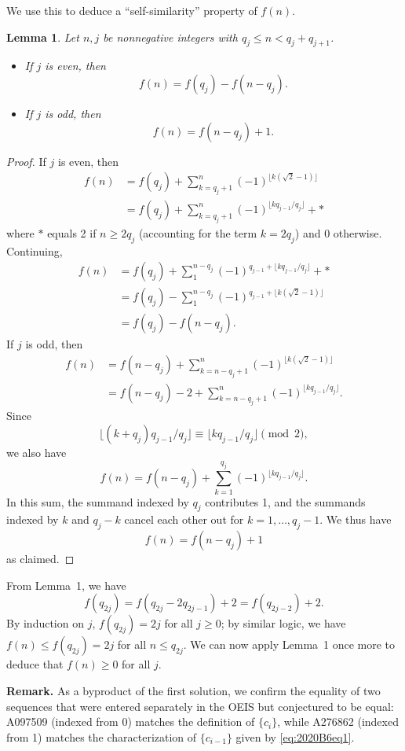\documentclass[amssymb,twocolumn,pra,10pt,aps]{revtex4-1}
\newtheorem{lemma}{Lemma}
\begin{document}
\begin{itemize}
We use this to deduce a ``self-similarity'' property of $f(n)$.
\setcounter{lemma}{0}
\begin{lemma}
Let $n,j$ be nonnegative integers with $q_j \leq n < q_j + q_{j+1}$.
\begin{itemize}
\item[(a)]
If $j$ is even, then
\[
f(n) = f(q_j) - f(n-q_j).
\]
\item[(b)]
If $j$ is odd, then
\[
f(n) = f(n-q_{j}) + 1.
\]
\end{itemize}
\end{lemma}
\begin{proof}
If $j$ is even, then
\begin{align*}
f(n) &= f(q_j) + \sum_{k=q_j+1}^n (-1)^{\lfloor k(\sqrt{2}-1) \rfloor} \\
&= f(q_j) + \sum_{k=q_j+1}^n (-1)^{\lfloor kq_{j-1}/q_j \rfloor} + *
\end{align*}
where $*$ equals 2 if $n \geq 2q_j$ (accounting for the term $k = 2q_j$) and 0 otherwise.
Continuing,
\begin{align*}
f(n)
&= f(q_j) + \sum_{1}^{n-q_j} (-1)^{q_{j-1} + \lfloor kq_{j-1}/q_j \rfloor} + * \\
&= f(q_j) - \sum_{1}^{n-q_j} (-1)^{q_{j-1} + \lfloor k(\sqrt{2}-1) \rfloor}\\
&= f(q_j) - f(n-q_j).
\end{align*}
If $j$ is odd, then
\begin{align*}
f(n) &= f(n-q_j) + \sum_{k=n-q_j+1}^n (-1)^{\lfloor k(\sqrt{2}-1) \rfloor} \\
&= f(n-q_j) -2 + \sum_{k=n-q_j+1}^n (-1)^{\lfloor kq_{j-1}/q_j \rfloor}.
\end{align*}
Since 
\[
\lfloor (k+q_j)q_{j-1}/q_j \rfloor \equiv \lfloor kq_{j-1}/q_j \rfloor \pmod{2},
\]
we also have
\[
f(n) = f(n-q_j) + \sum_{k=1}^{q_j} (-1)^{\lfloor kq_{j-1}/q_j \rfloor}.
\]
In this sum, the summand indexed by $q_j$ contributes 1, and the summands indexed by $k$ and $q_j-k$ cancel each other out for 
$k=1,\dots,q_j-1$. We thus have
\[
f(n) = f(n-q_j) + 1
\]
as claimed.
\end{proof}

From Lemma~1, we have
\[
f(q_{2j}) = f(q_{2j} - 2q_{2j-1}) + 2 = f(q_{2j-2}) + 2.
\]
By induction on $j$, $f(q_{2j}) = 2j$ for all $j \geq 0$;
by similar logic, we have $f(n) \leq f(q_{2j}) = 2j$ for all $n \leq q_{2j}$.
We can now apply Lemma~1 once more to deduce that $f(n) \geq 0$ for all $j$.

\noindent
\textbf{Remark.}
As a byproduct of the first solution, we confirm the equality of two sequences that were entered separately in the OEIS but conjectured to be equal:
A097509 (indexed from 0) matches the definition of $\{c_i\}$, while A276862 (indexed from 1)
matches the characterization of $\{c_{i-1}\}$ given by \eqref{eq:2020B6eq1}.


\end{itemize}
\end{document}
